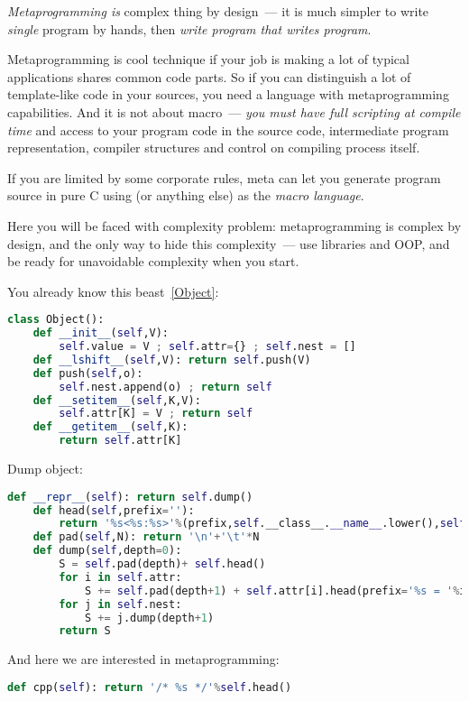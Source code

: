 \secdown

\begin{framed}
\emph{Metaprogramming is} complex thing by design\ --- it is much simpler to
write \textit{single} program by hands, then \emph{write program that writes
program}.
\end{framed}

\noindent
Metaprogramming is cool technique if your job is making a lot of typical
applications shares common code parts. So if you can distinguish a lot of
template-like code in your sources, you need a language with metaprogramming
capabilities. And it is not about macro\ --- \emph{you must have full scripting
at compile time} and access to your program code in the source code,
intermediate program representation, compiler structures and control on
compiling process itself.

\begin{framed}\noindent
If you are limited by some corporate rules, meta can let you generate program
source in pure C using \emph{\py} (or anything else) as the \emph{macro
language}.
\end{framed}

\noindent
Here you will be faced with complexity problem: metaprogramming is complex by
design, and the only way to hide this complexity\ --- use libraries and OOP, and
be ready for unavoidable complexity when you start.

\clearpage{}

You already know this beast\ \ref{Object}:
\begin{lstlisting}[language=Python]
class Object():
	def __init__(self,V):
		self.value = V ; self.attr={} ; self.nest = []
	def __lshift__(self,V): return self.push(V)
	def push(self,o):
		self.nest.append(o) ; return self
	def __setitem__(self,K,V):
		self.attr[K] = V ; return self
	def __getitem__(self,K):
		return self.attr[K]
\end{lstlisting}
\clearpage\noindent
Dump object:
\begin{lstlisting}[language=Python]
	def __repr__(self): return self.dump()
    def head(self,prefix=''):
        return '%s<%s:%s>'%(prefix,self.__class__.__name__.lower(),self.value)
    def pad(self,N): return '\n'+'\t'*N
    def dump(self,depth=0):
        S = self.pad(depth)+ self.head()
        for i in self.attr:
            S += self.pad(depth+1) + self.attr[i].head(prefix='%s = '%i)
        for j in self.nest:
            S += j.dump(depth+1)
        return S
\end{lstlisting}
And here we are interested in metaprogramming:
\begin{lstlisting}[language=Python]
    def cpp(self): return '/* %s */'%self.head()
\end{lstlisting}

\secup
